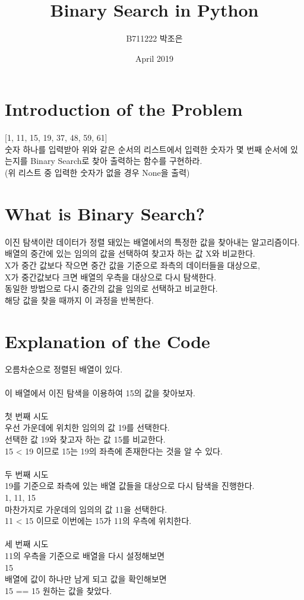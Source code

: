 \documentclass{article}
\begin{document}
\title{Binary Search in Python}
\author{B711222 박조은}
\date{April 2019}
\maketitle

\section{Introduction of the Problem}
[1, 11, 15, 19, 37, 48, 59, 61] \\
숫자 하나를 입력받아 위와 같은 순서의 리스트에서 입력한 숫자가 몇 번째 순서에 있는지를 Binary Search로 찾아 출력하는 함수를 구현하라. \\
(위 리스트 중 입력한 숫자가 없을 경우 None을 출력)

\section{What is Binary Search?}
이진 탐색이란 데이터가 정렬 돼있는 배열에서의 특정한 값을 찾아내는 알고리즘이다. \\
배열의 중간에 있는 임의의 값을 선택하여 찾고자 하는 값 X와 비교한다. \\
X가 중간 값보다 작으면 중간 값을 기준으로 좌측의 데이터들을 대상으로,\\
X가 중간값보다 크면 배열의 우측을 대상으로 다시 탐색한다. \\
동일한 방법으로 다시 중간의 값을 임의로 선택하고 비교한다. \\
해당 값을 찾을 때까지 이 과정을 반복한다.

\section{Explanation of the Code}
오름차순으로 정렬된 배열이 있다. \\
[1, 11, 15, 19, 37, 48, 59, 61] \\
이 배열에서 이진 탐색을 이용하여 15의 값을 찾아보자.\\
\\
첫 번째 시도\\
우선 가운데에 위치한 임의의 값 19를 선택한다. \\
선택한 값 19와 찾고자 하는 값 15를 비교한다. \\
15 < 19 이므로 15는 19의 좌측에 존재한다는 것을 알 수 있다. \\
\\
두 번째 시도\\
19를 기준으로 좌측에 있는 배열 값들을 대상으로 다시 탐색을 진행한다. \\
{1, 11, 15} \\
마찬가지로 가운데의 임의의 값 11을 선택한다. \\
11 < 15 이므로 이번에는 15가 11의 우측에 위치한다. \\
\\
세 번째 시도\\
11의 우측을 기준으로 배열을 다시 설정해보면 \\
{15}\\
배열에 값이 하나만 남게 되고 값을 확인해보면 \\
15 == 15 원하는 값을 찾았다.\\
\end{document}
